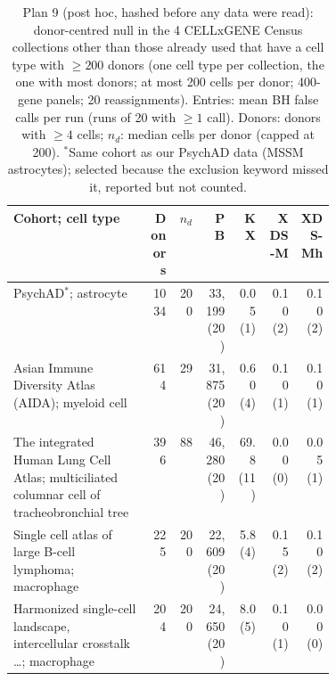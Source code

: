 \begin{table}[h]\centering\footnotesize\setlength{\tabcolsep}{3pt}
\caption{Plan 9 (post hoc, hashed before any data were read): donor-centred null in the 4 CELLxGENE Census collections other than those already used that have a cell type with $\ge200$ donors (one cell type per collection, the one with most donors; at most 200 cells per donor; 400-gene panels; 20 reassignments). Entries: mean BH false calls per run (runs of 20 with $\ge1$ call). Donors: donors with $\ge4$ cells; $n_d$: median cells per donor (capped at 200). $^{*}$Same cohort as our PsychAD data (MSSM astrocytes); selected because the exclusion keyword missed it, reported but not counted.}\label{tab:breadth}
\begin{tabular}{@{}p{0.42\linewidth}rrrrrr@{}}\toprule
Cohort; cell type & Donors & $n_d$ & PB & KX & XDS-M & XDS-Mh\\\midrule
PsychAD$^{*}$; astrocyte & 1034 & 200 & 33{,}199 (20) & 0.05 (1) & 0.10 (2) & 0.10 (2)\\
Asian Immune Diversity Atlas (AIDA); myeloid cell & 614 & 29 & 31{,}875 (20) & 0.60 (4) & 0.10 (1) & 0.10 (1)\\
The integrated Human Lung Cell Atlas; multiciliated columnar cell of tracheobronchial tree & 396 & 88 & 46{,}280 (20) & 69.8 (11) & 0.00 (0) & 0.05 (1)\\
Single cell atlas of large B-cell lymphoma; macrophage & 225 & 200 & 22{,}609 (20) & 5.8 (4) & 0.15 (2) & 0.10 (2)\\
Harmonized single-cell landscape, intercellular crosstalk \ldots; macrophage & 204 & 200 & 24{,}650 (20) & 8.0 (5) & 0.10 (1) & 0.00 (0)\\
\bottomrule
\end{tabular}\end{table}
